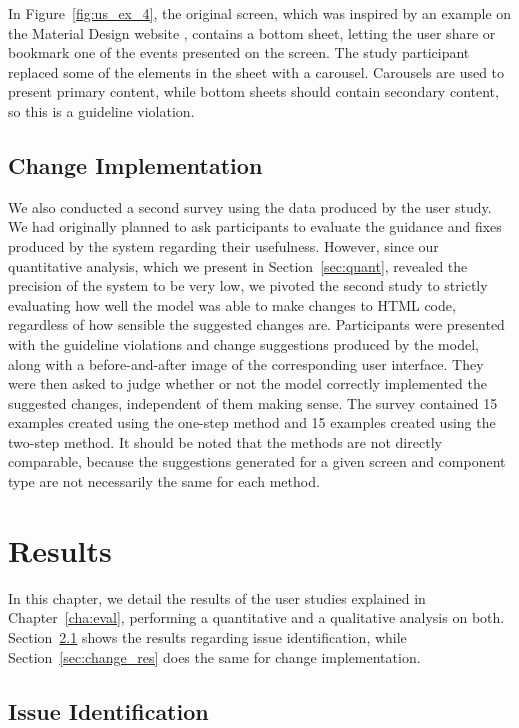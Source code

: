 \documentclass[11pt,titlepage,oneside,openany]{book}
\begin{document}
In Figure~\ref{fig:us_ex_4}, the original screen, which was inspired by an example on the Material Design website \cite{noauthor_carousel_nodate}, contains a bottom sheet, letting the user share or bookmark one of the events presented on the screen. The study participant replaced some of the elements in the sheet with a carousel. Carousels are used to present primary content, while bottom sheets should contain secondary content, so this is a guideline violation.

\section{Change Implementation}\label{sec:change}

We also conducted a second survey using the data produced by the user study. We had originally planned to ask participants to evaluate the guidance and fixes produced by the system regarding their usefulness. However, since our quantitative analysis, which we present in Section~\ref{sec:quant}, revealed the precision of the system to be very low, we pivoted the second study to strictly evaluating how well the model was able to make changes to HTML code, regardless of how sensible the suggested changes are. Participants were presented with the guideline violations and change suggestions produced by the model, along with a before-and-after image of the corresponding user interface. They were then asked to judge whether or not the model correctly implemented the suggested changes, independent of them making sense. The survey contained 15 examples created using the one-step method and 15 examples created using the two-step method. It should be noted that the methods are not directly comparable, because the suggestions generated for a given screen and component type are not necessarily the same for each method. 


\chapter{Results}\label{cha:res}

In this chapter, we detail the results of the user studies explained in Chapter~\ref{cha:eval}, performing a quantitative and a qualitative analysis on both. Section~\ref{sec:ident_res} shows the results regarding issue identification, while Section~\ref{sec:change_res} does the same for change implementation. 

\section{Issue Identification}\label{sec:ident_res}
\end{document}
